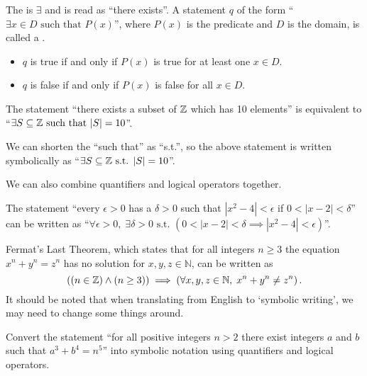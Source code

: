 \begin{definition}
    The  is $\exists$ and is read as ``there exists''. A statement $q$ of the form ``$\exists x \in D \textrm{ such that } P(x)$'', where $P(x)$ is the predicate and $D$ is the domain, is called a .
    \begin{itemize}
        \item $q$ is true if and only if $P(x)$ is true for at least one $x \in D$.
        \item $q$ is false if and only if $P(x)$ is false for all $x \in D$.
    \end{itemize}
\end{definition}

\begin{example}
    The statement ``there exists a subset of $\mathbb{Z}$ which has 10 elements'' is equivalent to ``$\exists S \subseteq \mathbb{Z} \text{ such that } |S| = 10$''.
\end{example}
\begin{remark}
    We can shorten the ``such that'' as ``s.t.'', so the above statement is written symbolically as ``$\exists S \subseteq \mathbb{Z} \text{ s.t. } |S| = 10$''.
\end{remark}

We can also combine quantifiers and logical operators together.
\begin{example}
    The statement ``every $\epsilon > 0$ has a $\delta > 0$ such that $|x^2 - 4| < \epsilon$ if $0 < |x - 2| < \delta$'' can be written as ``$\forall \epsilon > 0,\;\exists \delta > 0 \text{ s.t. } (0 < |x - 2| < \delta \implies |x^2 - 4| < \epsilon)$''.
\end{example}

\begin{example}
    Fermat's Last Theorem, which states that for all integers $n\geq 3$ the equation $x^n + y^n = z^n$ has no solution for $x, y, z \in \mathbb{N}$, can be written as
    \[
        \left((n \in \mathbb{Z}) \land (n \geq 3)\right) \implies \left(\forall x, y, z \in \mathbb{N},\; x^n + y^n \neq z^n\right).
    \]
    It should be noted that when translating from English to `symbolic writing', we may need to change some things around.
\end{example}

\begin{exercise}
    Convert the statement ``for all positive integers $n > 2$ there exist integers $a$ and $b$ such that $a^3 + b^4 = n^5$'' into symbolic notation using quantifiers and logical operators.
\end{exercise}

